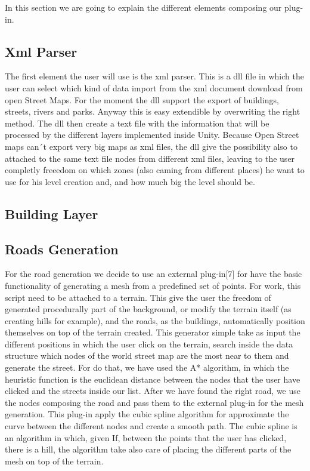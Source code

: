 \documentclass[conference]{IEEEtran}
\begin{document}
In this section we are going to explain the different elements composing our plug-in. 

\subsection{Xml Parser}

The first element the user will use is the xml parser. This is a dll file in which the user can select which kind of data import from the xml document download from open Street Maps. For the moment the dll support the export of buildings, streets, rivers and parks. Anyway this is easy extendible by overwriting the right method.  The dll then create a text file with the information that will be processed by the different layers implemented inside Unity. Because Open Street maps can´t export very big maps as xml files, the dll give the possibility also to attached to the same text file nodes from different xml files, leaving to the user completly freeedom on which zones (also caming from different places) he want to use for his level creation and, and how much big the level should be. 

\subsection{Building Layer}


\subsection{Roads Generation}

For the road generation we decide to use an external plug-in[7] for have the basic functionality of generating a mesh from a predefined set of points. For work, this script need to be attached to a terrain. This give the user the freedom of generated procedurally part of the background, or modify the terrain itself (as creating hills for example), and the roads, as the buildings, automatically position themselves on top of the terrain created. This generator simple take as input the different positions in which the user click on the terrain, search inside the data structure which nodes of the world street map are the most near to them and generate the street. For do that, we have used the A* algorithm, in which the heuristic function is the euclidean distance between the nodes that the user have clicked and the streets inside our list. After we have found the right road, we use the nodes composing the road and pass them to the external plug-in for the mesh generation. This plug-in apply the cubic spline algorithm for approximate the curve between the different nodes and create a smooth path. The cubic spline is an algorithm in which, given  If, between the points that the user has clicked, there is a hill, the algorithm take also care of placing the different parts of the mesh on top of the terrain. 
\end{document}
